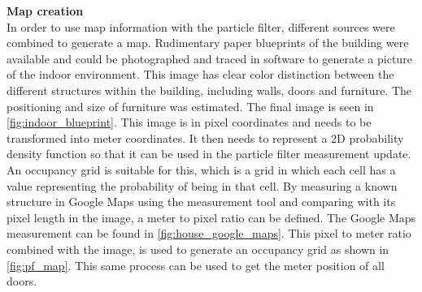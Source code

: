 \textbf{Map creation}\\
In order to use map information with the particle filter, different sources were combined to generate a map. Rudimentary paper blueprints of the building were available and could be photographed and traced in software to generate a picture of the indoor environment. This image has clear color distinction between the different structures within the building, including walls, doors and furniture. The positioning and size of furniture was estimated. The final image is seen in \cref{fig:indoor_blueprint}. This image is in pixel coordinates and needs to be transformed into meter coordinates. It then needs to represent a 2D probability density function so that it can be used in the particle filter measurement update. \\
An occupancy grid is suitable for this, which is a grid in which each cell has a value representing the probability of being in that cell. By measuring a known structure in Google Maps using the measurement tool and comparing with its pixel length in the image, a meter to pixel ratio can be defined. The Google Maps measurement can be found in \cref{fig:house_google_maps}. This pixel to meter ratio combined with the image, is used to generate an occupancy grid as shown in \cref{fig:pf_map}. This same process can be used to get the meter position of all doors.

